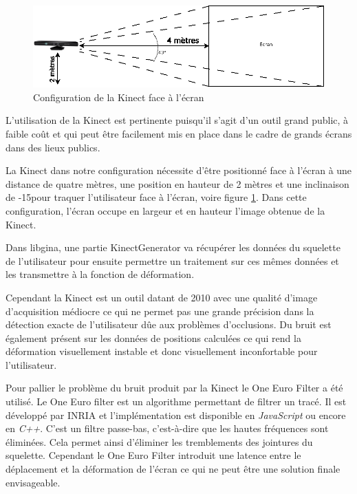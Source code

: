 \begin{figure}[!h]
	\center	
	\includegraphics[scale=0.5]{image/kinectScreen.png}
	\caption{Configuration de la Kinect face à l'écran}
	\label{fig:kinectScreen}
\end{figure}

L'utilisation de la Kinect est pertinente puisqu’il s’agit d’un outil grand public, à faible coût et qui peut être facilement mis en place dans le cadre de grands écrans dans des lieux publics.

La Kinect dans notre configuration nécessite d'être positionné face à l'écran à une distance de quatre mètres, une position en hauteur de 2 mètres et une inclinaison de -15\degres pour traquer l'utilisateur face à l'écran, voire figure \ref{fig:kinectScreen}. Dans cette configuration, l'écran occupe en largeur et en hauteur l'image obtenue de la Kinect.

Dans libgina, une partie KinectGenerator va récupérer les données du squelette de l'utilisateur pour ensuite permettre un traitement sur ces mêmes données et les transmettre à la fonction de déformation.

Cependant la Kinect est un outil datant de 2010 avec une qualité d'image d'acquisition médiocre ce qui ne permet pas une grande précision dans la détection exacte de l'utilisateur dûe aux problèmes d'occlusions. Du bruit est également présent sur les données de positions calculées ce qui rend la déformation visuellement instable et donc visuellement inconfortable pour l'utilisateur.

Pour pallier le problème du bruit produit par la Kinect le One Euro Filter \cite{oneeuro} a été utilisé. Le One Euro filter est un algorithme permettant de filtrer un tracé. Il est développé par INRIA et l’implémentation est disponible en \textit{JavaScript} ou encore en \textit{C++}. C'est un filtre passe-bas, c’est-à-dire que les hautes fréquences sont éliminées. Cela permet ainsi d'éliminer les tremblements des jointures du squelette. Cependant le One Euro Filter introduit une latence entre le déplacement et la déformation de l'écran ce qui ne peut être une solution finale envisageable.

